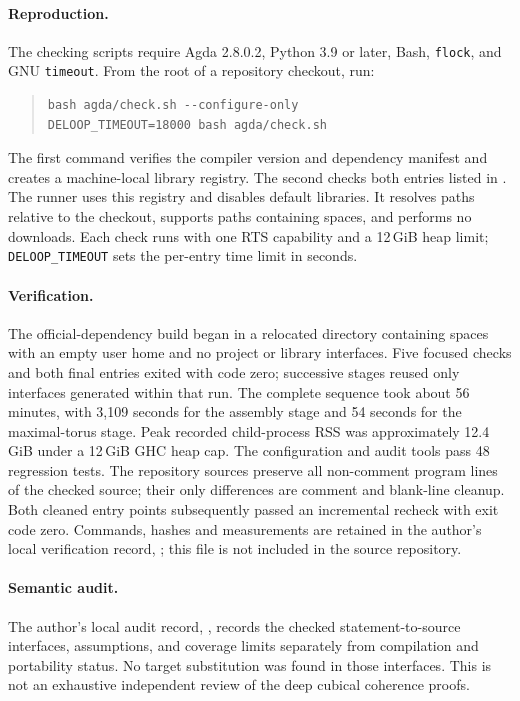\paragraph{Reproduction.}
The checking scripts require Agda 2.8.0.2, Python 3.9 or later, Bash,
\texttt{flock}, and GNU \texttt{timeout}. From the root of a repository checkout, run:
\begin{quote}\small
\begin{verbatim}
bash agda/check.sh --configure-only
DELOOP_TIMEOUT=18000 bash agda/check.sh
\end{verbatim}
\end{quote}
The first command verifies the compiler version and dependency manifest
and creates a machine-local library registry. The second checks both
entries listed in . The runner uses this registry
and disables default libraries. It resolves paths relative to the
checkout, supports paths containing spaces, and performs no downloads.
Each check runs with one RTS capability and a 12\,GiB heap limit;
\texttt{DELOOP\_TIMEOUT} sets the per-entry time limit in seconds.

\paragraph{Verification.}
The official-dependency build began in a relocated directory containing
spaces with an empty user home and no project or library interfaces.
Five focused checks and both final entries exited with code zero;
successive stages reused only interfaces generated within that run.
The complete sequence took about 56 minutes, with 3,109 seconds for the
assembly stage and 54 seconds for the maximal-torus stage. Peak recorded
child-process RSS was approximately 12.4\,GiB under a 12\,GiB GHC heap cap.
The configuration and audit tools pass 48 regression tests.
The repository sources preserve all non-comment program lines of the checked
source; their only differences are comment and blank-line cleanup.
Both cleaned entry points subsequently passed an incremental
recheck with exit code zero.
Commands, hashes and measurements are retained in the author's local
verification record, ; this file
is not included in the source repository.

\paragraph{Semantic audit.}
The author's local audit record, ,
records the checked statement-to-source interfaces, assumptions, and coverage
limits separately from compilation and portability status. No target substitution was found in those
interfaces. This is not an exhaustive independent review of the deep
cubical coherence proofs.

